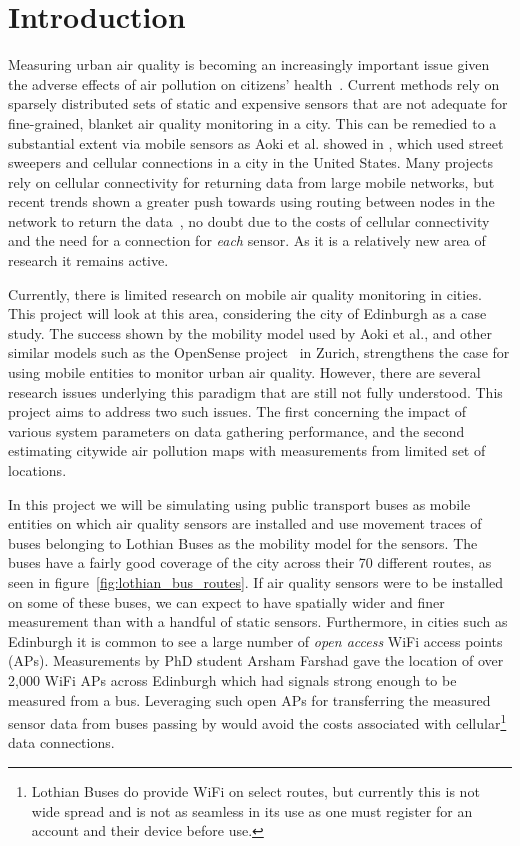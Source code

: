 \chapter{Introduction}\label{introduction}
    
    Measuring urban air quality is becoming an increasingly important issue given the adverse effects of air pollution on citizens' health~\cite{beijing2point5high}. Current methods rely on sparsely distributed sets of static and expensive sensors that are not adequate for fine-grained, blanket air quality monitoring in a city. This can be remedied to a substantial extent via mobile sensors as Aoki et al. showed in \cite{vehicleforresearch}, which used street sweepers and cellular connections in a city in the United States. Many projects rely on cellular connectivity for returning data from large mobile networks, but recent trends shown a greater push towards using routing between nodes in the network to return the data~\cite{manetmessaging,cafnet,cartel,commonsense}, no doubt due to the costs of cellular connectivity and the need for a connection for \emph{each} sensor. As it is a relatively new area of research it remains active. 

    Currently, there is limited research on mobile air quality monitoring in cities. This project will look at this area, considering the city of Edinburgh as a case study. The success shown by the mobility model used by Aoki et al., and other similar models such as the OpenSense project~\cite{opensensezurich} in Zurich, strengthens the case for using mobile entities to monitor urban air quality. However, there are several research issues underlying this paradigm that are still not fully understood. This project aims to address two such issues. The first concerning the impact of various system parameters on data gathering performance, and the second estimating citywide air pollution maps with measurements from limited set of locations. 

    In this project we will be simulating using public transport buses as mobile entities on which air quality sensors are installed and use movement traces of buses belonging to Lothian Buses as the mobility model for the sensors. The buses have a fairly good coverage of the city across their 70 different routes, as seen in figure~\ref{fig:lothian_bus_routes}. If air quality sensors were to be installed on some of these buses, we can expect to have spatially wider and finer measurement than with a handful of static sensors. Furthermore, in cities such as Edinburgh it is common to see a large number of \emph{open access} WiFi access points (APs). Measurements by PhD student Arsham Farshad gave the location of over 2,000 WiFi APs across Edinburgh which had signals strong enough to be measured from a bus. Leveraging such open APs for transferring the measured sensor data from buses passing by would avoid the costs associated with cellular\footnote{Lothian Buses do provide WiFi on select routes, but currently this is not wide spread and is not as seamless in its use as one must register for an account and their device before use.} data connections. 

